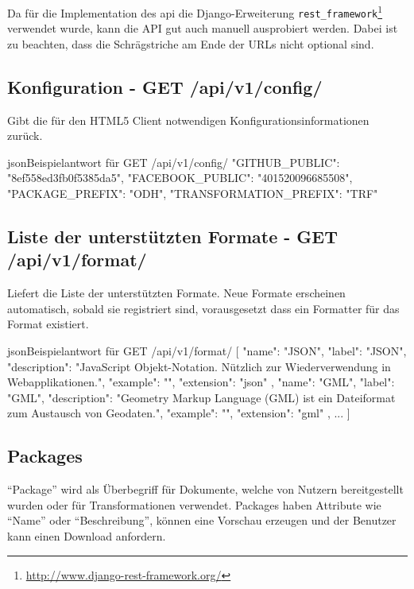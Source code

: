 Da für die Implementation des \gls{api} die Django-Erweiterung \texttt{rest\_framework}\footnote{\url{http://www.django-rest-framework.org/}} verwendet wurde, kann die API gut auch manuell ausprobiert werden. Dabei ist zu beachten, dass die Schrägstriche am Ende der URLs nicht optional sind.

\subsection{Konfiguration - GET /api/v1/config/}
Gibt die für den HTML5 Client notwendigen Konfigurationsinformationen zurück.

\begin{srclst}{json}{Beispielantwort für GET /api/v1/config/}
{
  "GITHUB_PUBLIC": "8ef558ed3fb0f5385da5", 
  "FACEBOOK_PUBLIC": "401520096685508", 
  "PACKAGE_PREFIX": "ODH", 
  "TRANSFORMATION_PREFIX": "TRF"
}
\end{srclst}

\subsection{Liste der unterstützten Formate - GET /api/v1/format/} \label{sec:pd:api-format}
Liefert die Liste der unterstützten Formate. Neue Formate erscheinen automatisch, sobald sie registriert sind, vorausgesetzt dass ein Formatter für das Format existiert.

\begin{srclst}{json}{Beispielantwort für GET /api/v1/format/}
[
    {
        "name": "JSON", 
        "label": "JSON", 
        "description": "JavaScript Objekt-Notation. Nützlich zur Wiederverwendung in Webapplikationen.", 
        "example": "", 
        "extension": "json"
    }, 
    {
        "name": "GML", 
        "label": "GML", 
        "description": "Geometry Markup Language (GML) ist ein Dateiformat zum Austausch von Geodaten.", 
        "example": "", 
        "extension": "gml"
    }, 
    ...
]
\end{srclst}

\subsection{Packages}
``Package'' wird als Überbegriff für Dokumente, welche von Nutzern bereitgestellt wurden oder für Transformationen verwendet. Packages haben Attribute wie ``Name'' oder ``Beschreibung'', können eine Vorschau erzeugen und der Benutzer kann einen Download anfordern.


